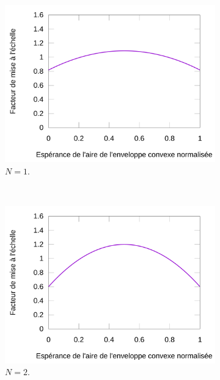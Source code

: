 	\begin{figure}[htbp]
		\begin{subfigure}[t]{0.49\textwidth}
			\centering
			\includegraphics[width=\textwidth]{figures/ch5/parabola1}
			\caption{$N=1$.}
			\label{fig:parabola1}
		\end{subfigure}
		~
		\begin{subfigure}[t]{0.49\textwidth}
			\centering
			\includegraphics[width=\textwidth]{figures/ch5/parabola2}
			\caption{$N=2$.}
			\label{fig:parabola2}
		\end{subfigure}
		~
		\begin{subfigure}[t]{0.49\textwidth}
			\centering

\end{subfigure}
\end{figure}
